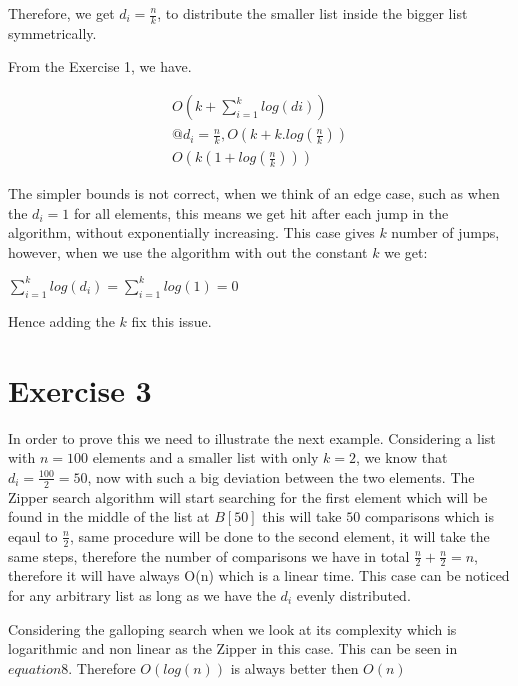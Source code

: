 \documentclass{article}
\begin{document}
\begin{flushleft}
Therefore, we get $d_i = \frac{n}{k}$, to distribute the smaller list inside the bigger list symmetrically.
\end{flushleft}
From the Exercise 1, we have. 

\begin{flushleft}
	\begin{equation}
		\begin{aligned}
	O(k + \sum_{i=1}^{k} log(di)) \\
	@d_i = \frac{n}{k}, O(k + k.log( \frac{n}{k})) \\
	O(k(1 + log( \frac{n}{k})))
	\end{aligned}
\end{equation}
\end{flushleft}
\begin{flushleft}
The simpler bounds is not correct, when we think of an edge case, such as when the $d_i = 1$ for all elements, this means we get hit after each jump in the algorithm, without exponentially increasing. This case gives $k$ number of jumps, however, when we use the algorithm with out the constant $k$ we get: 
\end{flushleft}

$  \sum_{i=1}^{k} log(d_i) = \sum_{i=1}^{k} log(1) = 0$

\begin{flushleft}
Hence adding the $k$ fix this issue.
\end{flushleft}

\clearpage




\section*{Exercise 3} %

In order to prove this we need to illustrate the next example. Considering a list with $n = 100$ elements and a smaller list with only $k = 2$, we know that $d_i = \frac{100}{2} = 50$, now with such a big deviation between the two elements. The Zipper search algorithm will start searching for the first element which will be found in the middle of the list at $B[50]$ this will take $50$ comparisons which is eqaul to $\frac{n}{2}$, same procedure will be done to the second element, it will take the same steps, therefore the number of comparisons we have in total $\frac{n}{2} + \frac{n}{2} = n$, therefore it will have always O(n) which is a linear time. This case can be noticed for any arbitrary list as long as we have the $d_i$ evenly distributed. 

Considering the galloping search when we look at its complexity which is logarithmic and non linear as the Zipper in this case. This can be seen in $equation 8$. Therefore $O(log(n))$ is always better then $O(n)$
\end{document}
